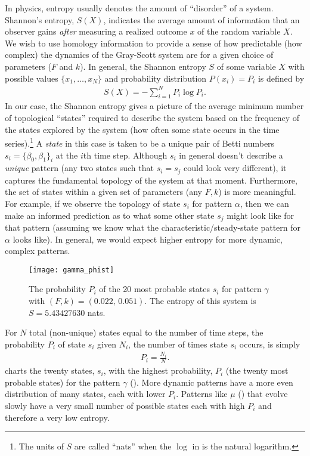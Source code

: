 In physics, entropy usually denotes the amount of ``disorder'' of a system. Shannon's entropy, $S(X)$, indicates the average amount of information that an observer gains \emph{after} measuring a realized outcome $x$ of the random variable $X$. We wish to use homology information to provide a sense of how predictable (how complex) the dynamics of the Gray-Scott system are for a given choice of parameters ($F$ and $k$). In general, the Shannon entropy $S$ of some variable $X$ with possible values $\{ x_1, \ldots, x_N \}$ and probability distribution $P(x_i) = P_i$ is defined by
\begin{align} \label{eq:shannon}
	S(X) = - \sum_{i=1}^{N} P_i \log{ P_i}.
\end{align}
In our case, the Shannon entropy gives a picture of the average minimum number of topological ``states'' required to describe the system based on the frequency of the states explored by the system (\ie how often some state occurs in the time series).\footnote{The units of $S$ are called ``nats'' when the $\log$ in  is the natural logarithm.} A \emph{state} in this case is taken to be a unique pair of Betti numbers $s_i = \{ \beta_0, \beta_1 \}_i$ at the $i$th time step. Although $s_i$ in general doesn't describe a \emph{unique} pattern (any two states such that $s_i = s_j$ could look very different), it captures the fundamental topology of the system at that moment. Furthermore, the set of states within a given set of parameters (any $F, k$) is more meaningful. For example, if we observe the topology of state $s_i$ for pattern $\alpha$, then we can make an informed prediction as to what some other state $s_j$ might look like for that pattern (assuming we know what the characteristic/steady-state pattern for $\alpha$ looks like). In general, we would expect higher entropy for more dynamic, complex patterns.

\begin{figure}[h]
	\centering
	\texttt{[image: gamma\_phist]}
                \caption{The probability $P_i$ of the 20 most probable states $s_i$ for pattern $\gamma$ with $(F, k) = (0.022,\, 0.051)$. The entropy of this system is $S = 5.43427630$ nats.}
                \label{fig:gamma_phist}
\end{figure}

For $N$ total (non-unique) states equal to the number of time steps, the probability $P_i$ of state $s_i$ given $N_i$, the number of times state $s_i$ occurs, is simply
\begin{align} \label{eq:Pi}
	P_i = \frac{N_i}{N}.
\end{align}
 charts the twenty states, $s_i$, with the highest probability, $P_i$ (\ie the twenty most probable states) for the pattern $\gamma$ (). More dynamic patterns have a more even distribution of many states, each with lower $P_i$. Patterns like $\mu$ () that evolve slowly have a very small number of possible states each with high $P_i$ and therefore a very low entropy.

